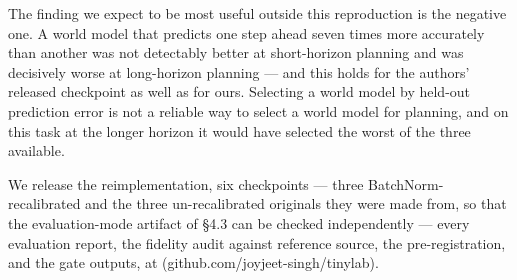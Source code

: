 \documentclass[10pt]{article}
\begin{document}
The finding we expect to be most useful outside this reproduction is the
negative one. A world model that predicts one step ahead seven times more
accurately than another was not detectably better at short-horizon planning and
was decisively worse at long-horizon planning --- and this holds for the authors'
released checkpoint as well as for ours. Selecting a world model by held-out
prediction error is not a reliable way to select a world model for planning, and
on this task at the longer horizon it would have selected the worst of the three
available.

We release the reimplementation, six checkpoints --- three BatchNorm-recalibrated and the three un-recalibrated originals they were made from, so that the evaluation-mode artifact of \S{}4.3 can be checked independently --- every evaluation report,
the fidelity audit against reference source, the pre-registration, and the gate
outputs, at (github.com/joyjeet-singh/tinylab).

\nocite{*}


\end{document}
